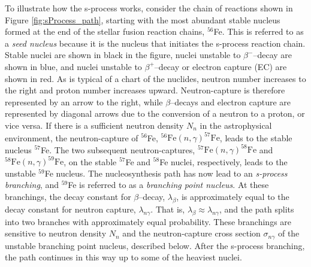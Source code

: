 To illustrate how the s-process works, consider the chain of reactions shown in Figure \ref{fig:sProcess_path}, starting with the most abundant stable nucleus formed at the end of the stellar fusion reaction chains, $^{56}$Fe. This is referred to as a \emph{seed nucleus} because it is the nucleus that initiates the s-process reaction chain. Stable nuclei are shown in black in the figure, nuclei unstable to $\beta^{-}$--decay are shown in blue, and nuclei unstable to $\beta^{+}$--decay or electron capture (EC) are shown in red. As is typical of a chart of the nuclides, neutron number increases to the right and proton number increases upward. Neutron-capture is therefore represented by an arrow to the right, while $\beta$--decays and electron capture are represented by diagonal arrows due to the conversion of a neutron to a proton, or vice versa. If there is a sufficient neutron density $N_{n}$ in the astrophysical environment, the neutron-capture of $^{56}$Fe, $^{56}\mathrm{Fe}(n,\gamma)^{57}\mathrm{Fe}$, leads to the stable nucleus $^{57}$Fe. The two subsequent neutron-captures,  $^{57}\mathrm{Fe}(n,\gamma)^{58}\mathrm{Fe}$ and  $^{58}\mathrm{Fe}(n,\gamma)^{59}\mathrm{Fe}$, on the stable $^{57}$Fe and $^{58}$Fe nuclei, respectively, leads to the unstable $^{59}$Fe nucleus. The nucleosynthesis path has now lead to an \emph{s-process branching}, and $^{59}$Fe is referred to as a \emph{branching point nucleus}. At these branchings, the decay constant for $\beta$--decay, $\lambda_{\beta}$, is approximately equal to the decay constant for neutron capture, $\lambda_{n\gamma}$. That is, $\lambda_{\beta} \approx \lambda_{n\gamma}$, and the path splits into two branches with approximately equal probability. These branchings are sensitive to neutron density $N_{n}$ and the neutron-capture cross section $\sigma_{n\gamma}$ of the unstable branching point nucleus, described below. After the s-process branching, the path continues in this way up to some of the heaviest nuclei.

